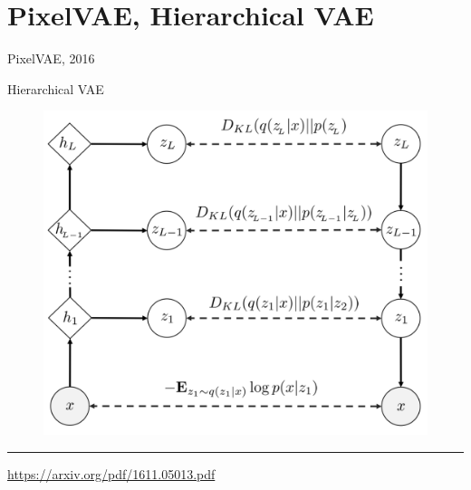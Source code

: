 \section{PixelVAE, Hierarchical VAE}
\begin{frame}{PixelVAE, 2016}
	\begin{block}{Hierarchical VAE}
		\begin{figure}
			\centering
			\includegraphics[width=0.7\linewidth]{figs/PixelVAE_1.png}
		\end{figure}
	\end{block}
	\vfill
	\hrule\medskip
	{\scriptsize \href{https://arxiv.org/pdf/1611.05013.pdf}{https://arxiv.org/pdf/1611.05013.pdf}}
\end{frame}
